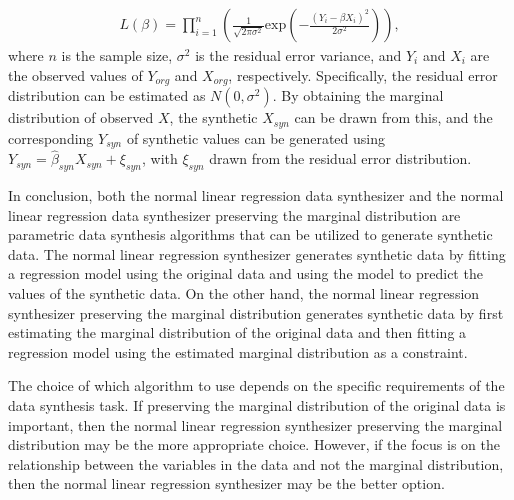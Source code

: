 \begin{align}
    \label{equ:mle}
    L(\beta)=\prod_{i=1}^{n}(\frac{1}{\sqrt{2\pi \sigma^2}}\text{exp}(-\frac{(Y_{i}-\beta X_{i})^2}{2\sigma^2})),
\end{align}
where $n$ is the sample size, $\sigma^2$ is the residual error variance, and $Y_i$ and $X_i$ are the observed values of $Y_{org}$ and $X_{org}$, respectively. Specifically, the residual error distribution can be estimated as $N(0, \sigma^2)$. By obtaining the marginal distribution of observed $X$, the synthetic $X_{syn}$ can be drawn from this, and the corresponding $Y_{syn}$ of synthetic values can be generated using $Y_{syn}=\hat{\beta}_{syn}X_{syn}+\xi_{syn}$, with $\xi_{syn}$ drawn from the residual error distribution.

In conclusion, both the normal linear regression data synthesizer and the normal linear regression data synthesizer preserving the marginal distribution are parametric data synthesis algorithms that can be utilized to generate synthetic data. The normal linear regression synthesizer generates synthetic data by fitting a regression model using the original data and using the model to predict the values of the synthetic data. On the other hand, the normal linear regression synthesizer preserving the marginal distribution generates synthetic data by first estimating the marginal distribution of the original data and then fitting a regression model using the estimated marginal distribution as a constraint.

The choice of which algorithm to use depends on the specific requirements of the data synthesis task. If preserving the marginal distribution of the original data is important, then the normal linear regression synthesizer preserving the marginal distribution may be the more appropriate choice. However, if the focus is on the relationship between the variables in the data and not the marginal distribution, then the normal linear regression synthesizer may be the better option.


